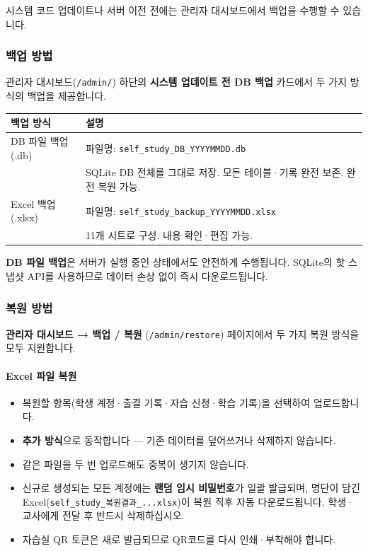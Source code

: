\documentclass[a4paper,12pt]{article}
\newcommand{\menu}[1]{\textcolor{primary}{\textbf{#1}}}
\begin{document}
시스템 코드 업데이트나 서버 이전 전에는 관리자 대시보드에서 백업을 수행할 수 있습니다.

\subsubsection*{백업 방법}

관리자 대시보드(\texttt{/admin/}) 하단의 \textbf{시스템 업데이트 전 DB 백업} 카드에서
두 가지 방식의 백업을 제공합니다.

\begin{center}
\begin{tabularx}{\textwidth}{lX}
\toprule
\textbf{백업 방식} & \textbf{설명} \\
\midrule
DB 파일 백업 (.db) &
파일명: \texttt{self\_study\_DB\_YYYYMMDD.db} \\
& SQLite DB 전체를 그대로 저장. 모든 테이블·기록 완전 보존. 완전 복원 가능. \\[0.3em]
Excel 백업 (.xlsx) &
파일명: \texttt{self\_study\_backup\_YYYYMMDD.xlsx} \\
& 11개 시트로 구성. 내용 확인·편집 가능. \\
\bottomrule
\end{tabularx}
\end{center}

\begin{notebox}
  \textbf{DB 파일 백업}은 서버가 실행 중인 상태에서도 안전하게 수행됩니다.
  SQLite의 핫 스냅샷 API를 사용하므로 데이터 손상 없이 즉시 다운로드됩니다.
\end{notebox}

\subsubsection*{복원 방법}

\menu{관리자 대시보드 → 백업 / 복원} (\texttt{/admin/restore}) 페이지에서
두 가지 복원 방식을 모두 지원합니다.

\paragraph{Excel 파일 복원}
\begin{itemize}
  \item 복원할 항목(학생 계정·출결 기록·자습 신청·학습 기록)을 선택하여 업로드합니다.
  \item \textbf{추가 방식}으로 동작합니다 --- 기존 데이터를 덮어쓰거나 삭제하지 않습니다.
  \item 같은 파일을 두 번 업로드해도 중복이 생기지 않습니다.
  \item 신규로 생성되는 모든 계정에는 \textbf{랜덤 임시 비밀번호}가 일괄 발급되며,
        명단이 담긴 Excel(\texttt{self\_study\_복원결과\_...xlsx})이 복원 직후 자동 다운로드됩니다.
        학생·교사에게 전달 후 반드시 삭제하십시오.
  \item 자습실 QR 토큰은 새로 발급되므로 QR코드를 다시 인쇄·부착해야 합니다.
\end{itemize}
\end{document}
